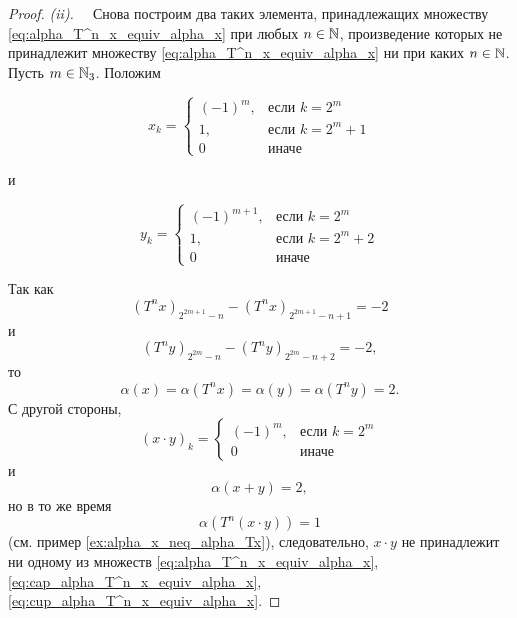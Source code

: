 \begin{proof}
	\textit{(ii).~~}
	Снова построим два таких элемента, принадлежащих множеству \eqref{eq:alpha_T^n_x_equiv_alpha_x} при любых $n\in\mathbb{N}$,
	произведение которых не принадлежит множеству \eqref{eq:alpha_T^n_x_equiv_alpha_x} ни при каких $n\in\mathbb{N}$.
	Пусть $m\in\mathbb{N}_3$.
	Положим

	\begin{equation}
		x_k = \begin{cases}
			(-1)^m,  & \mbox{если } k = 2^m     \\
			1,                   & \mbox{если } k = 2^m + 1 \\
			0                    & \mbox{иначе }
		\end{cases}
	\end{equation}

	и

	\begin{equation}
		y_k = \begin{cases}
			(-1)^{m+1},  & \mbox{если } k = 2^m     \\
			1,                   & \mbox{если } k = 2^m + 2 \\
			0                    & \mbox{иначе }
		\end{cases}
	\end{equation}

	Так как
	\begin{equation}
		(T^n x)_{2^{2m+1}-n} - (T^n x)_{2^{2m+1}-n+1} = -2
	\end{equation}
	и
	\begin{equation}
		(T^n y)_{2^{2m}-n} - (T^n y)_{2^{2m}-n+2} = -2
		,
	\end{equation}
	то
	\begin{equation}
		\alpha(x) = \alpha(T^n x) = \alpha(y) = \alpha(T^n y) = 2
		.
	\end{equation}
	С другой стороны,
	\begin{equation}
		(x\cdot y)_k = \begin{cases}
			(-1)^m,  & \mbox{если } k = 2^m     \\
			0        & \mbox{иначе }
		\end{cases}
	\end{equation}
	и
	\begin{equation}
		\alpha(x+y) = 2
		,
	\end{equation}
	но в то же время
	\begin{equation}
		\alpha(T^n(x \cdot y)) = 1
	\end{equation}
	(см. пример \ref{ex:alpha_x_neq_alpha_Tx}),
	следовательно, $x \cdot y$ не принадлежит ни одному из множеств
	\eqref{eq:alpha_T^n_x_equiv_alpha_x}, \eqref{eq:cap_alpha_T^n_x_equiv_alpha_x}, \eqref{eq:cup_alpha_T^n_x_equiv_alpha_x}.
\end{proof}
